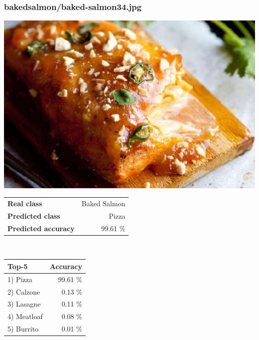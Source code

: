 \subsubsection{baked\textunderscore salmon/baked-salmon34.jpg}

\begin{minipage}[t]{0.4\textwidth}
	\vspace{0pt}
	\includegraphics[width=\linewidth]{images/evaluation-images/baked_salmon/baked-salmon34.jpg}
\end{minipage}
\hfill
\begin{minipage}[t]{0.5\textwidth}
	\vspace{0pt}\raggedright
	\begin{tabularx}{\textwidth}{X r}
		\small \textbf{Real class} & \small Baked Salmon\\
		\small \textbf{Predicted class} & \small Pizza\\
		\small \textbf{Predicted accuracy} & \small 99.61 \%
    \end{tabularx}\\
    
    \vspace{6pt}
	\begin{tabularx}{\textwidth}{X r}
        \small \textbf{Top-5} & \small \textbf{Accuracy} \\
        \hline
		\small 1) Pizza & \small 99.61 \%\\\small 2) Calzone & \small 0.13 \%\\\small 3) Lasagne & \small 0.11 \%\\\small 4) Meatloaf & \small 0.08 \%\\\small 5) Burrito & \small 0.01 \%
    \end{tabularx}
\end{minipage}
    
